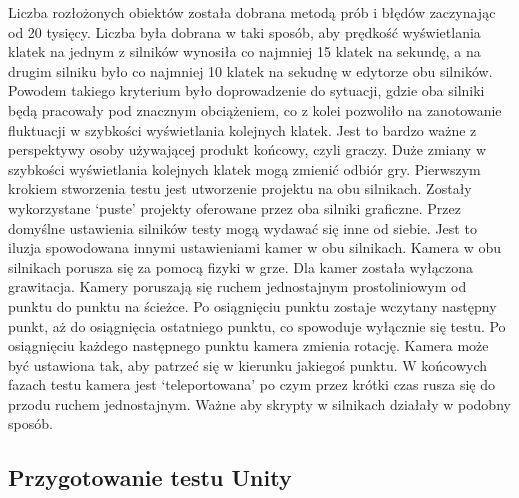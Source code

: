 \documentclass[12pt,twoside]{article}
\begin{document}
Liczba rozłożonych obiektów została dobrana metodą prób i błędów zaczynając od
20 tysięcy. Liczba była dobrana w taki sposób, aby prędkość wyświetlania klatek
na jednym z silników wynosiła co najmniej 15 klatek na sekundę, a na drugim
silniku było co najmniej 10 klatek na sekudnę w edytorze obu silników. Powodem
takiego kryterium było doprowadzenie do sytuacji, gdzie oba silniki będą
pracowały pod znacznym obciążeniem, co z kolei pozwoliło na zanotowanie
fluktuacji w szybkości wyświetlania kolejnych klatek. Jest to bardzo ważne z
perspektywy osoby używającej produkt końcowy, czyli graczy. Duże zmiany w
szybkości wyświetlania kolejnych klatek mogą zmienić odbiór gry. Pierwszym
krokiem stworzenia testu jest utworzenie projektu na obu silnikach. Zostały
wykorzystane ‘puste’ projekty oferowane przez oba silniki graficzne. Przez
domyślne ustawienia silników testy mogą wydawać się inne od siebie. Jest to
iluzja spowodowana innymi ustawieniami kamer w obu silnikach. Kamera w obu
silnikach porusza się za pomocą fizyki w grze. Dla kamer została wyłączona
grawitacja.  Kamery poruszają się ruchem jednostajnym prostoliniowym od punktu
do punktu na ścieżce. Po osiągnięciu punktu zostaje wczytany następny punkt, aż
do osiągnięcia ostatniego punktu, co spowoduje wyłącznie się testu. Po
osiągnięciu każdego następnego punktu kamera zmienia rotację. Kamera może być
ustawiona tak, aby patrzeć się w kierunku jakiegoś punktu. W końcowych fazach
testu kamera jest ‘teleportowana’ po czym przez krótki czas rusza się do przodu
ruchem jednostajnym. Ważne aby skrypty w silnikach działały w podobny sposób. 


\subsection{Przygotowanie testu Unity}
\end{document}

